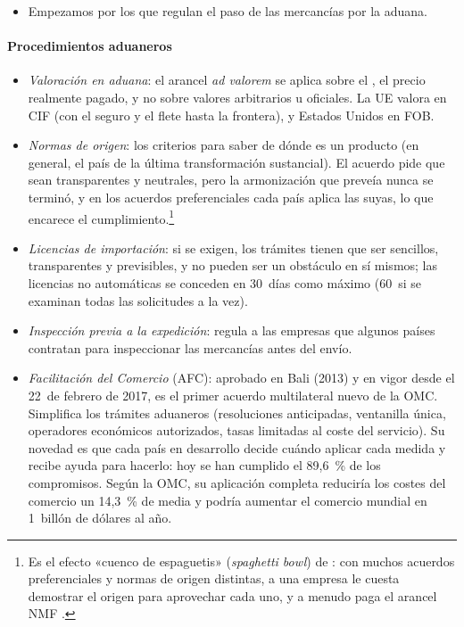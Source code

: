 \documentclass[11pt]{article}
\begin{document}
\begin{infografia}[H]
\centering
\caption{Los acuerdos sobre cuestiones y sectores específicos del anexo~1A: año e idea clave}\label{figu:especificos}
\end{infografia}

\begin{itemize}
\item Empezamos por los que regulan el paso de las mercancías por la aduana.
\end{itemize}

\paragraph{Procedimientos aduaneros}

\begin{itemize}
\item \emph{Valoración en aduana}: el arancel \emph{ad valorem} se aplica sobre el , el precio realmente pagado, y no sobre valores arbitrarios u oficiales. La UE valora en CIF (con el seguro y el flete hasta la frontera), y Estados Unidos en FOB.
\item \emph{Normas de origen}: los criterios para saber de dónde es un producto (en general, el país de la última transformación sustancial). El acuerdo pide que sean transparentes y neutrales, pero la armonización que preveía nunca se terminó, y en los acuerdos preferenciales cada país aplica las suyas, lo que encarece el cumplimiento.\footnote{Es el efecto «cuenco de espaguetis» (\emph{spaghetti bowl}) de : con muchos acuerdos preferenciales y normas de origen distintas, a una empresa le cuesta demostrar el origen para aprovechar cada uno, y a menudo paga el arancel NMF .}
\item \emph{Licencias de importación}: si se exigen, los trámites tienen que ser sencillos, transparentes y previsibles, y no pueden ser un obstáculo en sí mismos; las licencias no automáticas se conceden en 30~días como máximo (60~si se examinan todas las solicitudes a la vez)\nocite{OMC2026EntenderBNA}.
\item \emph{Inspección previa a la expedición}: regula a las empresas que algunos países contratan para inspeccionar las mercancías antes del envío.
\item \emph{Facilitación del Comercio} (AFC): aprobado en Bali (2013) y en vigor desde el 22~de febrero de 2017, es el primer acuerdo multilateral nuevo de la OMC. Simplifica los trámites aduaneros (resoluciones anticipadas, ventanilla única, operadores económicos autorizados, tasas limitadas al coste del servicio). Su novedad es que cada país en desarrollo decide cuándo aplicar cada medida y recibe ayuda para hacerlo: hoy se han cumplido el 89,6~\% de los compromisos\nocite{OMC2026AFC}. Según la OMC, su aplicación completa reduciría los costes del comercio un 14,3~\% de media y podría aumentar el comercio mundial en 1~billón de dólares al año\nocite{OMC2026AFCPagina}.
\end{itemize}
\end{document}
